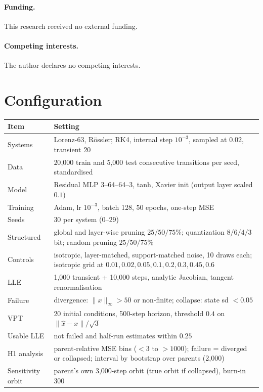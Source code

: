 \documentclass[11pt]{article}
\begin{document}
\paragraph{Funding.} This research received no external funding.
\paragraph{Competing interests.} The author declares no competing interests.





\appendix
\section{Configuration}
\begin{center}\small
\begin{tabular}{lp{}}
\toprule
Item & Setting\\
\midrule
Systems & Lorenz-63, R\"ossler; RK4, internal step $10^{-3}$, sampled at $0.02$, transient $20$\\
Data & 20{,}000 train and 5{,}000 test consecutive transitions per seed, standardised\\
Model & Residual MLP 3--64--64--3, tanh, Xavier init (output layer scaled $0.1$)\\
Training & Adam, lr $10^{-3}$, batch 128, 50 epochs, one-step MSE\\
Seeds & 30 per system (0--29)\\
Structured & global and layer-wise pruning $25/50/75\%$; quantization $8/6/4/3$ bit; random pruning $25/50/75\%$\\
Controls & isotropic, layer-matched, support-matched noise, 10 draws each; isotropic grid at $0.01,0.02,0.05,0.1,0.2,0.3,0.45,0.6$\\
LLE & 1{,}000 transient + 10{,}000 steps, analytic Jacobian, tangent renormalisation\\
Failure & divergence: $\|x\|_\infty>50$ or non-finite; collapse: state sd $<0.05$\\
VPT & 20 initial conditions, 500-step horizon, threshold $0.4$ on $\|\hat x-x\|/\sqrt3$\\
Usable LLE & not failed and half-run estimates within $0.25$\\
H1 analysis & parent-relative MSE bins ($<3$ to $>1000$); failure = diverged or collapsed; interval by bootstrap over parents (2{,}000)\\
Sensitivity orbit & parent's own 3{,}000-step orbit (true orbit if collapsed), burn-in 300\\
\bottomrule
\end{tabular}
\end{center}
\end{document}

